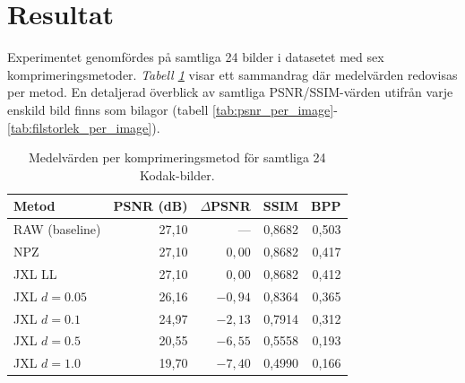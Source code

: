 


\section*{Resultat}

Experimentet genomfördes på samtliga 24 bilder i datasetet med sex
komprimeringsmetoder. \textit{Tabell \ref{tab:summary}} visar ett sammandrag där medelvärden redovisas
per metod. En detaljerad överblick av samtliga PSNR/SSIM-värden utifrån varje enskild bild finns som bilagor (tabell \ref{tab:psnr_per_image}-\ref{tab:filstorlek_per_image}).


\begin{table}[h]
\centering
\caption{Medelvärden per komprimeringsmetod för samtliga 24 Kodak-bilder.}
\label{tab:summary}
\begin{tabular}{lrrrr}
\hline
\textbf{Metod} & \textbf{PSNR (dB)} & \boldmath$\Delta$\textbf{PSNR} & \textbf{SSIM} & \textbf{BPP} \\
\hline
RAW (baseline)         & 27{,}10 & ---       & 0{,}8682 & 0{,}503 \\
NPZ                    & 27{,}10 & $0{,}00$  & 0{,}8682 & 0{,}417 \\
JXL LL                 & 27{,}10 & $0{,}00$  & 0{,}8682 & 0{,}412 \\
JXL $d=0{.}05$         & 26{,}16 & $-0{,}94$ & 0{,}8364 & 0{,}365 \\
JXL $d=0{.}1$          & 24{,}97 & $-2{,}13$ & 0{,}7914 & 0{,}312 \\
JXL $d=0{.}5$          & 20{,}55 & $-6{,}55$ & 0{,}5558 & 0{,}193 \\
JXL $d=1{.}0$          & 19{,}70 & $-7{,}40$ & 0{,}4990 & 0{,}166 \\
\hline
\end{tabular}
\end{table}

